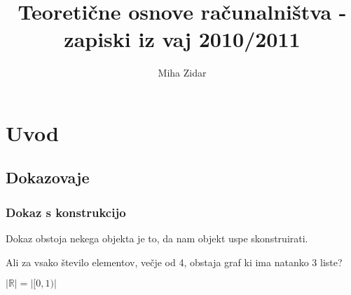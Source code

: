 \documentclass[10pt,a4paper,oneside]{book}
\author{Miha Zidar}
\title{Teoretične osnove računalništva - zapiski iz vaj 2010/2011}
\begin{document}
\maketitle
\newpage
\tableofcontents


\pagebreak
\chapter{Uvod}
\section{Dokazovaje}
\subsection{Dokaz s konstrukcijo}
Dokaz obstoja nekega objekta je to, da nam objekt uspe skonstruirati.

\begin{primeri}
\item Ali za vsako število elementov, večje od 4, obstaja graf ki ima natanko 3 liste?
\item $| \mathbb{R} | = | [0,1) |$
\end{primeri}
	
\end{document}
